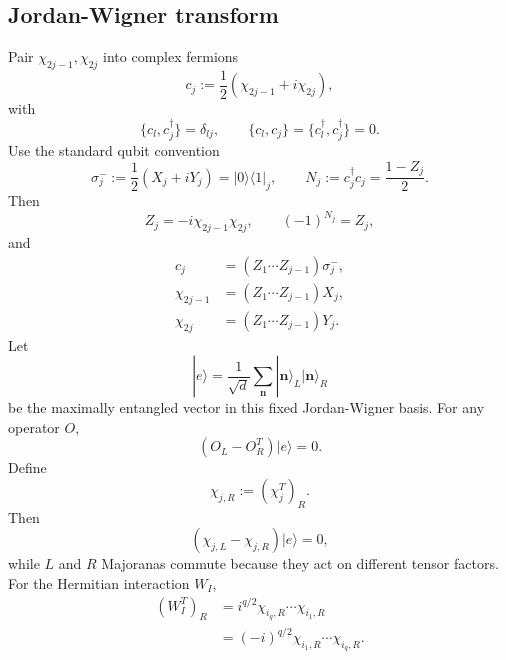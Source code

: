 \documentclass{article}
\theoremstyle{definition}
\begin{document}
\subsection{Jordan-Wigner transform}

Pair $\chi_{2j-1},\chi_{2j}$ into complex fermions
\begin{equation}
    c_j:=\frac12(\chi_{2j-1}+i\chi_{2j}),
\end{equation}
with
\begin{equation}
    \{c_l,c_j^\dagger\}=\delta_{lj},
    \qquad
    \{c_l,c_j\}=\{c_l^\dagger,c_j^\dagger\}=0.
\end{equation}
Use the standard qubit convention
\begin{equation}
    \sigma_j^-:=\frac12(X_j+iY_j)=|0\rangle\langle1|_j,
    \qquad
    N_j:=c_j^\dagger c_j=\frac{1-Z_j}{2}.
\end{equation}
Then
\begin{equation}
    Z_j=-i\chi_{2j-1}\chi_{2j},
    \qquad
    (-1)^{N_j}=Z_j,
\end{equation}
and
\begin{align}
    c_j&=(Z_1\cdots Z_{j-1})\sigma_j^-,
    \nonumber\\
    \chi_{2j-1}&=(Z_1\cdots Z_{j-1})X_j,
    \nonumber\\
    \chi_{2j}&=(Z_1\cdots Z_{j-1})Y_j.
\end{align}
Let
\begin{equation}
    |e\rangle
    =\frac1{\sqrt d}\sum_{\mathbf n}
    |\mathbf n\rangle_L|\mathbf n\rangle_R
\end{equation}
be the maximally entangled vector in this fixed Jordan-Wigner basis.  For
any operator $O$,
\begin{equation}
    (O_L-O_R^T)|e\rangle=0.
\end{equation}
Define
\begin{equation}
    \chi_{j,R}:=(\chi_j^T)_R.
\end{equation}
Then
\begin{equation}
    (\chi_{j,L}-\chi_{j,R})|e\rangle=0,
\end{equation}
while $L$ and $R$ Majoranas commute because they act on different tensor
factors.  For the Hermitian interaction $W_I$,
\begin{align}
    (W_I^T)_R
    &=i^{q/2}\chi_{i_q,R}\cdots\chi_{i_1,R}
    \nonumber\\
    &=(-i)^{q/2}\chi_{i_1,R}\cdots\chi_{i_q,R}.
\end{align}
\end{document}

